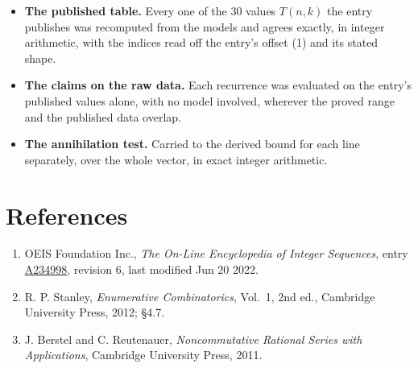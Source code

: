 \documentclass[11pt]{article}
\theoremstyle{definition}
\begin{document}
\begin{itemize}

\item {\bfseries The published table.} Every one of the 30 values $T(n,k)$ the entry publishes was recomputed from the models and agrees exactly, in integer arithmetic, with the indices read off the entry's offset (1) and its stated shape.

\item {\bfseries The claims on the raw data.} Each recurrence was evaluated on the entry's published values alone, with no model involved, wherever the proved range and the published data overlap.

\item {\bfseries The annihilation test.} Carried to the derived bound for each line separately, over the whole vector, in exact integer arithmetic.

\end{itemize}

\section{References}

\begin{enumerate}

\item OEIS Foundation Inc., \emph{The On-Line Encyclopedia of Integer Sequences}, entry \href{https://oeis.org/A234998}{A234998}, revision 6, last modified Jun 20 2022.

\item R. P. Stanley, \emph{Enumerative Combinatorics}, Vol.~1, 2nd ed., Cambridge University Press, 2012; \S4.7.

\item J. Berstel and C. Reutenauer, \emph{Noncommutative Rational Series with Applications}, Cambridge University Press, 2011.

\end{enumerate}
\end{document}
